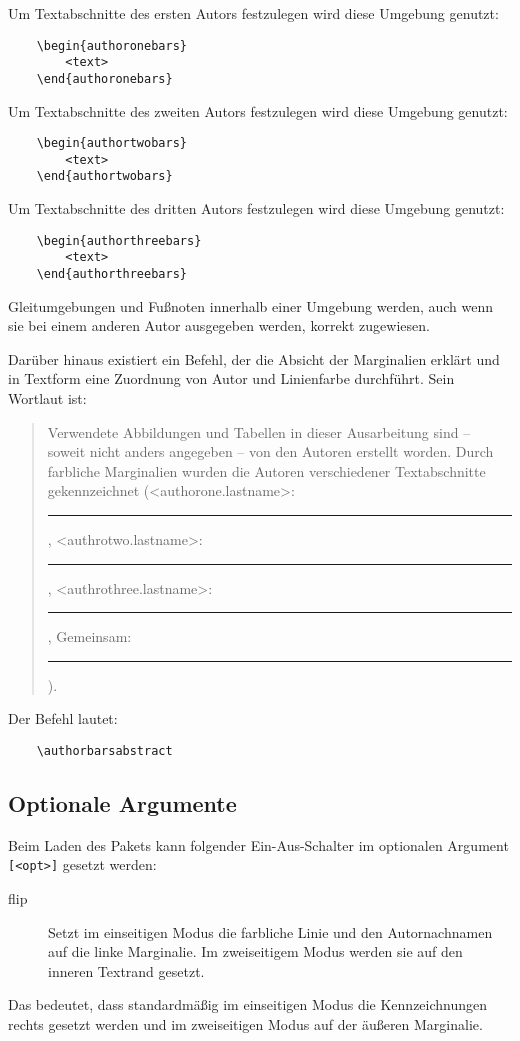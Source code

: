 \documentclass[%
	fontsize=10pt, 
	DIV=8, 
]{scrartcl}
\begin{document}
Um Textabschnitte des ersten Autors festzulegen wird diese Umgebung genutzt:
\begin{verbatim}
	\begin{authoronebars}
		<text>
	\end{authoronebars}
\end{verbatim}

Um Textabschnitte des zweiten Autors festzulegen wird diese Umgebung genutzt:
\begin{verbatim}
	\begin{authortwobars}
		<text>
	\end{authortwobars}
\end{verbatim}

Um Textabschnitte des dritten Autors festzulegen wird diese Umgebung genutzt:
\begin{verbatim}
	\begin{authorthreebars}
		<text>
	\end{authorthreebars}
\end{verbatim}

Gleitumgebungen und Fußnoten innerhalb einer Umgebung werden, auch wenn sie bei einem anderen Autor ausgegeben werden, korrekt zugewiesen.

Darüber hinaus existiert ein Befehl, der die Absicht der Marginalien erklärt und in Textform eine Zuordnung von Autor und Linienfarbe durchführt. Sein Wortlaut ist:
\begin{quote}
Verwendete Abbildungen und Tabellen in dieser Ausarbeitung sind -- soweit nicht anders angegeben -- von den Autoren erstellt worden. Durch farbliche Marginalien wurden die Autoren verschiedener Textabschnitte gekennzeichnet (<authorone.lastname>:~\textcolor{green1}{\rule{2pt}{0.7em}}, <authrotwo.lastname>:~\textcolor{blue1}{\rule{2pt}{0.7em}}, <authrothree.lastname>:~\textcolor{violet}{\rule{2pt}{0.7em}}, Gemeinsam:~\textcolor{orange1}{\rule{2pt}{0.7em}}).
\end{quote}
Der Befehl lautet:
\begin{verbatim}
	\authorbarsabstract	
\end{verbatim}

\subsection{Optionale Argumente}
\label{subsec:opt}
Beim Laden des Pakets kann folgender Ein-Aus-Schalter im optionalen Argument \verb+[<opt>]+ gesetzt werden:
\begin{description}
	\item[flip] Setzt im einseitigen Modus die farbliche Linie und den Autornachnamen auf die linke Marginalie. Im zweiseitigem Modus werden sie auf den inneren Textrand gesetzt.
\end{description}
Das bedeutet, dass standardmäßig im einseitigen Modus die Kennzeichnungen rechts gesetzt werden und im zweiseitigen Modus auf der äußeren Marginalie.
\end{document}
